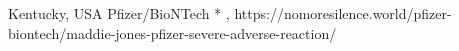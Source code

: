           {Kentucky, USA}
          {}
          {Pfizer/BioNTech}
          {*}
          {
            ,
          }
          {https://nomoresilence.world/pfizer-biontech/maddie-jones-pfizer-severe-adverse-reaction/}

